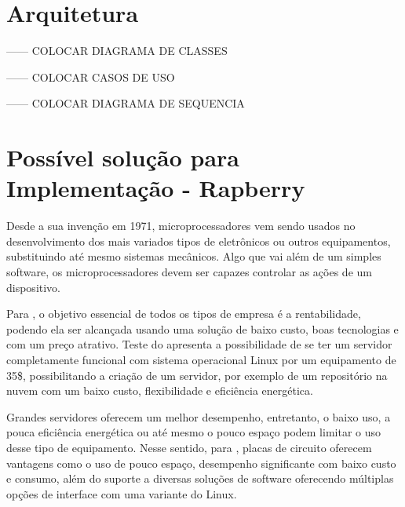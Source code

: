 \section{Arquitetura}
------ COLOCAR DIAGRAMA DE CLASSES

------ COLOCAR CASOS DE USO

------ COLOCAR DIAGRAMA DE SEQUENCIA
 

\section{Possível solução para Implementação - Rapberry}
Desde a sua invenção em 1971, microprocessadores vem sendo usados no desenvolvimento dos mais variados tipos de eletrônicos ou outros equipamentos, substituindo até mesmo sistemas mecânicos. Algo que vai além de um simples software, os microprocessadores devem ser capazes controlar as ações de um dispositivo. \cite{rosenstark2007}

Para \cite{aristotelous2016}, o objetivo essencial de todos os tipos de empresa é a rentabilidade, podendo ela ser alcançada usando uma solução de baixo custo, boas tecnologias e com um preço atrativo. Teste do \cite{aristotelous2016} apresenta a possibilidade de se ter um servidor completamente funcional com sistema operacional Linux por um equipamento de 35\$, possibilitando a criação de um servidor, por exemplo de um repositório na nuvem com um baixo custo, flexibilidade e eficiência energética. 

Grandes servidores oferecem um melhor desempenho, entretanto, o baixo uso, a pouca eficiência energética ou até mesmo o pouco espaço podem limitar o uso desse tipo de equipamento. Nesse sentido, para \cite{cusick2014}, placas de circuito oferecem vantagens como o uso de pouco espaço, desempenho significante com baixo custo e consumo, além do suporte a diversas soluções de software oferecendo múltiplas opções de interface com uma variante do Linux. 